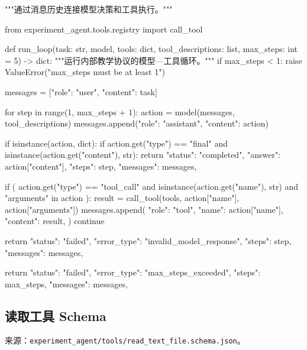 \documentclass[UTF8,zihao=-4,fontset=fandol]{ctexart}
\begin{document}
\begin{Code}
"""通过消息历史连接模型决策和工具执行。"""

from experiment_agent.tools.registry import call_tool


def run_loop(task: str, model, tools: dict, tool_descriptions: list, max_steps: int = 5) -> dict:
    """运行内部教学协议的模型—工具循环。"""
    if max_steps < 1:
        raise ValueError("max_steps must be at least 1")

    messages = [{"role": "user", "content": task}]

    for step in range(1, max_steps + 1):
        action = model(messages, tool_descriptions)
        messages.append({"role": "assistant", "content": action})

        if isinstance(action, dict):
            if action.get("type") == "final" and isinstance(action.get("content"), str):
                return {
                    "status": "completed",
                    "answer": action["content"],
                    "steps": step,
                    "messages": messages,
                }

            if (
                action.get("type") == "tool_call"
                and isinstance(action.get("name"), str)
                and "arguments" in action
            ):
                result = call_tool(tools, action["name"], action["arguments"])
                messages.append({
                    "role": "tool",
                    "name": action["name"],
                    "content": result,
                })
                continue

        return {
            "status": "failed",
            "error_type": "invalid_model_response",
            "steps": step,
            "messages": messages,
        }

    return {
        "status": "failed",
        "error_type": "max_steps_exceeded",
        "steps": max_steps,
        "messages": messages,
    }
\end{Code}

\subsection{读取工具 Schema}

来源：\nolinkurl{experiment_agent/tools/read_text_file.schema.json}。

\end{document}
